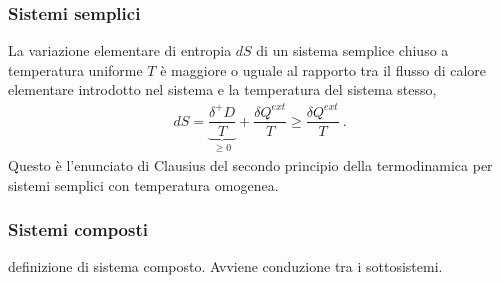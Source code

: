 \documentclass[letterpaper,10pt,italian]{jupyterBook}
\begin{document}
\subsubsection{Sistemi semplici}
\label{\detokenize{ch/thermodynamics/principles-second:sistemi-semplici}}
\sphinxAtStartPar
La variazione elementare di entropia \(d S\) di un sistema semplice chiuso a temperatura uniforme \(T\) è maggiore o uguale al rapporto tra il flusso di calore elementare introdotto nel sistema e la temperatura del sistema stesso,
\begin{equation*}
\begin{split}dS = \underbrace{\dfrac{\delta^+ D}{T}}_{\ge 0} + \dfrac{\delta Q^{ext}}{T} \ge \dfrac{\delta Q^{ext}}{T} \ .\end{split}
\end{equation*}
\sphinxAtStartPar
Questo è l’enunciato di Clausius del secondo principio della termodinamica per sistemi semplici con temperatura omogenea.


\subsubsection{Sistemi composti}
\label{\detokenize{ch/thermodynamics/principles-second:sistemi-composti}}
\sphinxAtStartPar
{} definizione di sistema composto. Avviene conduzione tra i sotto\sphinxhyphen{}sistemi.
\end{document}
